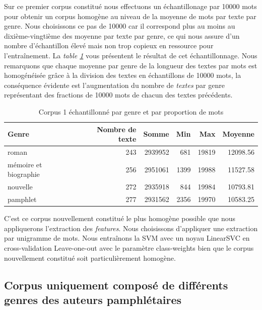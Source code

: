  Sur ce premier corpus constitué nous effectuons un échantillonage par 10000 mots pour obtenir un corpus homogène au niveau de la moyenne de mots par texte par genre. Nous choisissons ce pas de 10000 car il correspond plus au moins au dixième-vingtième des moyenne par texte par genre, ce qui nous assure d'un nombre d'échantillon élevé mais non trop copieux en ressource pour l'entraînement. La \textit{table \ref{'tab:corpus-mix-echantillons-word'}} vous présentent le résultat de cet échantillonnage. Nous remarquons que chaque moyenne par genre de la longueur des textes par mots est homogénéisée grâce à la division des textes en échantillons de 10000 mots, la conséquence évidente est l'augmentation du nombre de \textit{textes} par genre représentant des fractions de 10000 mots de chacun des textes précédents.

\begin{table}[H]
    \centering
    \begin{tabular}{lrrrrr}
    \toprule
    Genre & Nombre de texte & Somme & Min & Max & Moyenne  \\
    \toprule
    \midrule
    roman & 243 & 2939952 & 681 & 19819 & 12098.56 \\
    \midrule
    mémoire et biographie & 256 & 2951061 & 1399 & 19988 & 11527.58 \\
    \midrule
    nouvelle & 272 & 2935918 & 844 & 19984 & 10793.81 \\
    \midrule
    pamphlet & 277 & 2931562 & 2356 & 19970 & 10583.25 \\
    \bottomrule
    \end{tabular}
    \caption{Corpus 1 échantillonné par genre et par proportion de mots}
    \label{'tab:corpus-mix-echantillons-word'}
\end{table}

C'est ce corpus nouvellement constitué le plus homogène possible que nous appliquerons l'extraction des \textit{features}. Nous choisissons d'appliquer une extraction par unigramme de mots. Nous entraînons la SVM avec un noyau LinearSVC en cross-validation Leave-one-out avec le paramètre class-weights bien que le corpus nouvellement constitué soit particulièrement homogène.

\subsection{Corpus uniquement composé de différents genres des auteurs pamphlétaires}

